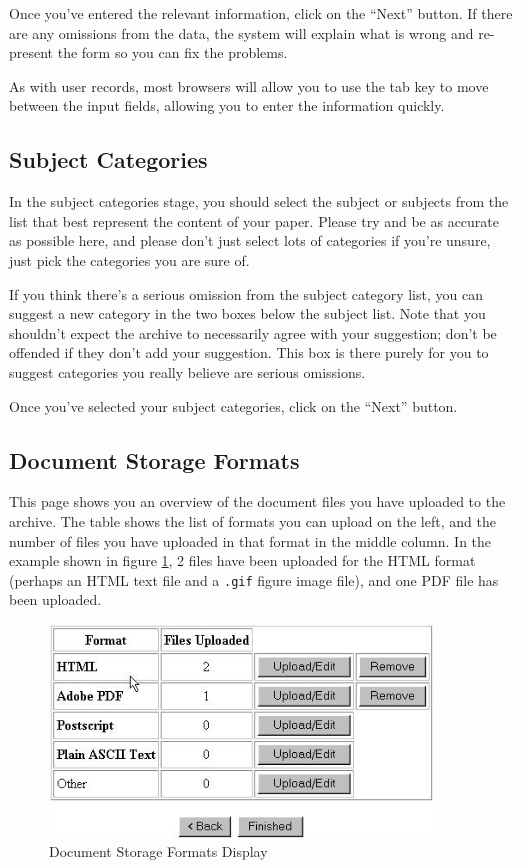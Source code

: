 Once you've entered the relevant information, click on the ``Next'' button. If there are any omissions from the data, the system will explain what is wrong and re-present the form so you can fix the problems.

As with user records, most browsers will allow you to use the tab key to move between the input fields, allowing you to enter the information quickly.


\subsection{Subject Categories}

In the subject categories stage, you should select the subject or subjects from the list that best represent the content of your paper. Please try and be as accurate as possible here, and please don't just select lots of categories if you're unsure, just pick the categories you are sure of.

If you think there's a serious omission from the subject category list, you can suggest a new category in the two boxes below the subject list. Note that you shouldn't expect the archive to necessarily agree with your suggestion; don't be offended if they don't add your suggestion. This box is there purely for you to suggest categories you really believe are serious omissions.

Once you've selected your subject categories, click on the ``Next'' button.


\subsection{Document Storage Formats}

This page shows you an overview of the document files you have uploaded to the archive. The table shows the list of formats you can upload on the left, and the number of files you have uploaded in that format in the middle column. In the example shown in figure \ref{storage_formats}, 2 files have been uploaded for the HTML format (perhaps an HTML text file and a {\tt .gif} figure image file), and one PDF file has been uploaded.

\begin{figure}
\centerline{\includegraphics[width=4.0in]{images/storage-formats}}
\caption{\label{storage_formats} Document Storage Formats Display}
\end{figure}

